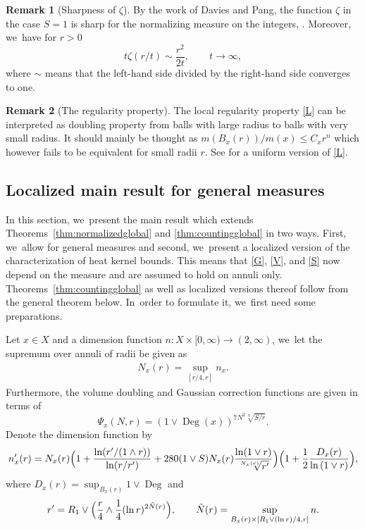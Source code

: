 \documentclass[10pt]{amsart}
\theoremstyle{plain}
\theoremstyle{definition}
\newtheorem*{remark}{Remark}
\DeclareMathOperator{\Deg}{Deg}
\begin{document}
\begin{remark}[{Sharpness of $ \zeta $}]By the work of Davies and Pang, the function $\zeta$ in the case $S=1$ is sharp for the normalizing measure on the integers,
\cite{Davies-93, Pang-93}. Moreover, we~have for $r>0$
\[
t\zeta(r/t)\sim \frac{r^2}{2t},\qquad t\to \infty,
\]
where {$\sim$}
means that the left-hand side divided by the right-hand side converges to one.
\end{remark}

\begin{remark}[{The regularity property}] The local regularity property \eqref{L} can be interpreted as doubling property from balls with large radius to balls with very small radius. It should mainly be thought as $ m(B_{x}(r))/m(x)\leq C_x r^{n} $ which however fails to be equivalent for small radii $ r $. See \cite{BarlowChen-16} for a uniform version of \eqref{L}.
\end{remark}

\subsection{Localized main result for general measures}\label{section:mainresults}

{
In this section, we~present the main result which extends Theorems~\ref{thm:normalizedglobal} and \ref{thm:countingglobal} in two ways. First, we~allow for general measures and second, we~present a localized version of the characterization of heat kernel bounds. This means that \eqref{G}, \eqref{V}, and \eqref{S} now depend on the measure and are assumed to hold on annuli only.
Theorems~\ref{thm:countingglobal} as well as localized versions thereof follow from the general theorem below. In~order to formulate it, we~first need some preparations.
}

{Let $x\in X$ and}
a dimension function {$n\colon X\times [0,\infty)\to (2,\infty)$}, we~let the supremum over annuli {of radii} be given as
\begin{align*}
N_x(r)=\sup_{[r/4,r]} n_x.
\end{align*}
Furthermore, the volume doubling and {Gaussian} correction functions are given in terms of
\[
\Psi_x(N,r)=\left(1\vee\Deg(x)
\right)^{7N^2\sqrt[N]{S/r}}.
\]
Denote
the dimension function by
\[
n_x'(r)=
N_x(r) \Bigl(1+\frac{\ln(r'/(1\wedge r))}{\ln(r/r')} +{28
0 (1\vee S) N_x(r){\frac{\ln (1\vee r)}{\sqrt[ N_x(r)]{r'}}}}\Bigr)\Bigl(1+ \frac{1}{2}\frac{D_x(r)} {\ln \left(1\vee r\right)}\Bigr),
\]
where $D_x(r)=\sup_{B_x(r)}1\vee \Deg$ and
\[
r'= R_1\vee\Bigl( \frac{r}{4}\wedge \frac{1}{4}(\ln r)^{2\tilde N(r)}\Bigr),\qquad \tilde N(r)=\sup_{B_{x}(r)\times [R_1\vee (\ln r)/4,r]}n.
\]
\end{document}
